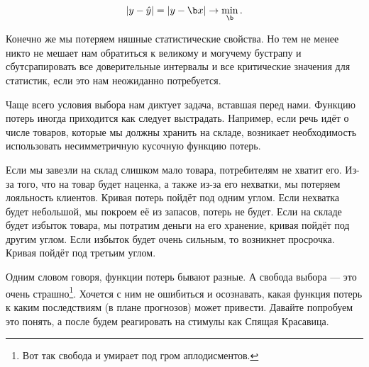 \[ |y - \hat y| = |y - \b x| \to \min_{\b}. \]

Конечно же мы потеряем няшные статистические свойства. Но тем не менее никто не мешает нам обратиться к великому и могучему бустрапу и сбутсрапировать все доверительные интервалы и все критические значения для статистик, если это нам неожиданно потребуется. 

Чаще всего условия выбора нам диктует задача, вставшая перед нами. Функцию потерь иногда приходится как следует выстрадать. Например, если речь идёт о числе товаров, которые мы должны хранить на складе, возникает необходимость использовать несимметричную кусочную функцию потерь.  

Если мы завезли на склад слишком мало товара, потребителям не хватит его. Из-за того, что на товар будет наценка, а также из-за его нехватки, мы потеряем лояльность клиентов. Кривая потерь пойдёт под одним углом. Если нехватка будет небольшой, мы покроем её из запасов, потерь не будет. Если на складе будет избыток товара, мы потратим деньги на его хранение, кривая пойдёт под другим углом. Если избыток будет очень сильным, то возникнет просрочка. Кривая пойдёт под третьим углом.  

\begin{center}
\end{center}


Одним словом говоря, функции потерь бывают разные. А свобода выбора --- это очень страшно\footnote{Вот так свобода и умирает под гром аплодисментов.}. Хочется с ним не ошибиться и осознавать, какая функция потерь к каким последствиям (в плане прогнозов) может привести.  Давайте попробуем это понять, а после будем реагировать на стимулы как Спящая Красавица. 

